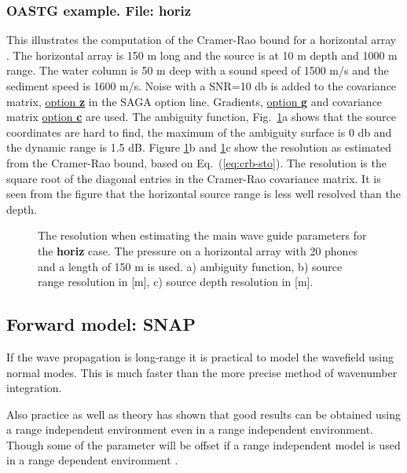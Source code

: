 \documentclass{saclantc}
\begin{document}

\subsubsection{OASTG example. File: {\bf horiz}}
\label{se:horiz}
This illustrates the computation of the Cramer-Rao bound for a horizontal
array \cite{gerstoft:ica98}. The horizontal array is 150 m long and the source is at 10 m
depth and 1000 m range. The  water column is  50 m deep with a sound
speed of 1500 m/s and the sediment speed is 1600 m/s. 
Noise  with a SNR=10 db is added to the covariance matrix,
 \underline{option {\bf z}} in the SAGA option line.
 Gradients,  \underline{option {\bf g}} and covariance matrix 
\underline{option {\bf c}} are used.
The ambiguity function, Fig.\ \ref{fig:horiz}a shows that the source 
coordinates are hard to
find, the maximum of the ambiguity surface is 0 db and the dynamic
range is 1.5 dB.
Figure \ref{fig:horiz}b and \ref{fig:horiz}c show
 the resolution as estimated from the Cramer-Rao
bound, based on Eq.~(\ref{eq:crb-sto}). The resolution is the square
root of the diagonal entries in the Cramer-Rao covariance matrix.
It is seen from the figure that the horizontal source range is less
well  resolved than the depth.



\begin{figure}
\epsfxsize=12cm
\centerline{}
\caption{ The resolution when estimating the main wave guide
parameters for the {\bf horiz} case.
The pressure on a   horizontal array with 20 phones and a length of 150
m  is used.
a) ambiguity function,
b) source range resolution in [m],
c) source depth resolution in [m].
}
\label{fig:horiz}
\end{figure}


\subsection{Forward model: SNAP}

If the wave propagation is long-range it is practical to model the
wavefield using normal modes. This is much faster than the more precise
method of wavenumber integration.

Also practice as well as theory has shown that good results can be obtained using a range independent environment even in a range independent environment. 
Though some of the parameter will be offset if a range independent model is used in a range dependent environment \cite{gerstoft:asa96}.
\end{document}
